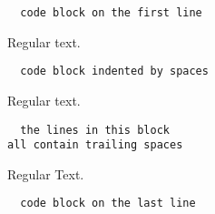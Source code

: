 \begin{verbatim}
  code block on the first line
\end{verbatim}

Regular text.
\begin{verbatim}
  code block indented by spaces
\end{verbatim}

Regular text.
\begin{verbatim}
  the lines in this block  
all contain trailing spaces  
\end{verbatim}

Regular Text.
\begin{verbatim}
  code block on the last line
\end{verbatim}